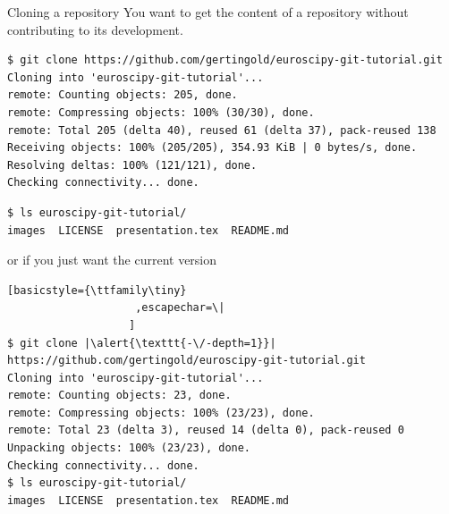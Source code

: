 \documentclass[svgnames]{beamer}
\begin{document}
\begin{frame}[fragile]{Cloning a repository}
  You want to get the content of a repository without contributing
	to its development.

 \begin{lstlisting}[basicstyle={\ttfamily\tiny}]
$ git clone https://github.com/gertingold/euroscipy-git-tutorial.git
Cloning into 'euroscipy-git-tutorial'...
remote: Counting objects: 205, done.
remote: Compressing objects: 100% (30/30), done.
remote: Total 205 (delta 40), reused 61 (delta 37), pack-reused 138
Receiving objects: 100% (205/205), 354.93 KiB | 0 bytes/s, done.
Resolving deltas: 100% (121/121), done.
Checking connectivity... done.
 \end{lstlisting}

 \begin{lstlisting}[basicstyle={\ttfamily\tiny}]
$ ls euroscipy-git-tutorial/
images  LICENSE  presentation.tex  README.md
 \end{lstlisting}

 or if you just want the current version
 \begin{lstlisting}[basicstyle={\ttfamily\tiny}
                    ,escapechar=\|
                   ]
$ git clone |\alert{\texttt{-\/-depth=1}}| https://github.com/gertingold/euroscipy-git-tutorial.git
Cloning into 'euroscipy-git-tutorial'...
remote: Counting objects: 23, done.
remote: Compressing objects: 100% (23/23), done.
remote: Total 23 (delta 3), reused 14 (delta 0), pack-reused 0
Unpacking objects: 100% (23/23), done.
Checking connectivity... done.
$ ls euroscipy-git-tutorial/
images  LICENSE  presentation.tex  README.md
 \end{lstlisting}

\end{frame}
\end{document}
